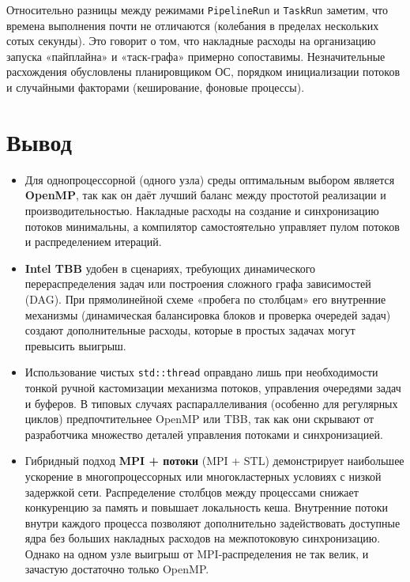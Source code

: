 \documentclass[12pt]{article}
\begin{document}
Относительно разницы между режимами \texttt{PipelineRun} и \texttt{TaskRun} заметим, что времена выполнения почти не отличаются (колебания в пределах нескольких сотых секунды). Это говорит о том, что накладные расходы на организацию запуска «пайплайна» и «таск-графа» примерно сопоставимы. Незначительные расхождения обусловлены планировщиком ОС, порядком инициализации потоков и случайными факторами (кеширование, фоновые процессы).

\section{Вывод}

\begin{itemize}
  \item Для однопроцессорной (одного узла) среды оптимальным выбором является \textbf{OpenMP}, так как он даёт лучший баланс между простотой реализации и производительностью. Накладные расходы на создание и синхронизацию потоков минимальны, а компилятор самостоятельно управляет пулом потоков и распределением итераций.
  
  \item \textbf{Intel TBB} удобен в сценариях, требующих динамического перераспределения задач или построения сложного графа зависимостей (DAG). При прямолинейной схеме «пробега по столбцам» его внутренние механизмы (динамическая балансировка блоков и проверка очередей задач) создают дополнительные расходы, которые в простых задачах могут превысить выигрыш.
  
  \item Использование чистых \texttt{std::thread} оправдано лишь при необходимости тонкой ручной кастомизации механизма потоков, управления очередями задач и буферов. В типовых случаях распараллеливания (особенно для регулярных циклов) предпочтительнее OpenMP или TBB, так как они скрывают от разработчика множество деталей управления потоками и синхронизацией.
  
  \item Гибридный подход \textbf{MPI + потоки} (MPI + STL) демонстрирует наибольшее ускорение в многопроцессорных или многокластерных условиях с низкой задержкой сети. Распределение столбцов между процессами снижает конкуренцию за память и повышает локальность кеша. Внутренние потоки внутри каждого процесса позволяют дополнительно задействовать доступные ядра без больших накладных расходов на межпотоковую синхронизацию. Однако на одном узле выигрыш от MPI-распределения не так велик, и зачастую достаточно только OpenMP.
  

\end{itemize}
\end{document}

